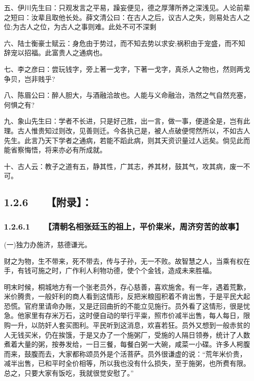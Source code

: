 \documentclass[letterpaper,10pt,english]{sphinxmanual}
\begin{document}
五、伊川先生曰：只观发言之平易，躁妄便见，德之厚薄所养之深浅见。人论前辈之短曰：汝辈且取他长处。薛文清公曰：在古人之后，议古人之失，则易处古人之位;为古人之位，为古人之事则难。此处不可不深剩

六、陆士衡豪士赋云：身危由于势过，而不知去势以求安;祸积由于宠盛，而不知辞宠以招福。此富贵人之通病也。

七、李之彦曰：尝玩钱字，旁上著一戈字，下著一戈字，真杀人之物也，然则两戈争贝，岂非贱乎?

八、陈眉公曰：醉人胆大，与酒融洽故也。人能与义命融治，浩然之气自然充塞，何惧之有?

九、象山先生曰：学者不长进，只是好己胜，出一言，做一事，便道全是，岂有此理。古人惟贵知过则改，见善则迁。今各执己是，被人点破便愕然所以，不如古人先生。此言乃天下学者之通病，若能不蹈此病，则其天资识量过人远矣。倘见此而能省察悔悟，将来亦必有所成就。

十、古人云：教子之道有五，静其性，广其志，养其材，鼓其气，攻其病，废一不可。


\subsection{1.2.6   【附录】：}
\label{\detokenize{p00_u5176_u5b83/_u300a_u5f20_u82f1-_u806a_u8bad_u658b_u8bed_u300b_u300a_u5f20_u5ef7_u7389-_u6f84_u6000_u56ed_u8bed_u300b_u5408_u8f91:id13}}

\subsubsection{1.2.6.1   【清朝名相张廷玉的祖上，平价粜米，周济穷苦的故事】}
\label{\detokenize{p00_u5176_u5b83/_u300a_u5f20_u82f1-_u806a_u8bad_u658b_u8bed_u300b_u300a_u5f20_u5ef7_u7389-_u6f84_u6000_u56ed_u8bed_u300b_u5408_u8f91:id14}}
(一)独力办施济，慈德谦光。

财之为物，生不带来，死不带去，传与子孙，无一不败。故智慧之人，当乘有权在手，有钱可施之时，广作利人利物功德，使个个金钱，造成未来胜福。

明末时候，桐城地方有一个张老员外，存心慈善，喜欢施舍。有一年，遇着荒歉，米价腾贵，一般奸利的商人看到这情形，反把米粮囤积着不肯出售，于是平民大起恐慌。官府里请命办账，又是迂回曲折的不能立见施行。员外看了这情形，很是忧急。他家里有存米万石，这时便自动的举行平粜，照市价减半出售，每人每日，限购一升，以防奸人套买图利。平民听到这消息，欢喜若狂。员外又想到一般赤贫的人无钱买米，仍在挨饿，于是又办了一个施粥厂，受施的人隔日领券，统计了人数煮着大量的粥，按券发给，一日三餐，每餐白粥一大碗，咸菜一小碟。许多人枵腹而来，鼓腹而去，大家都称颂员外是个活菩萨。员外很谦虚的说：“荒年米价贵，减半出售，已和平时全价相等，所以我也没有什么损失，至于施粥，也所费有限。总之，只要大家有饭吃，我就很觉安慰了。”
\end{document}
